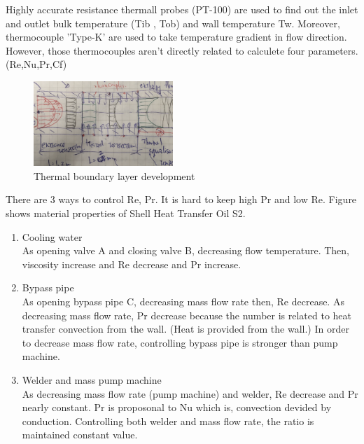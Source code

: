 \documentclass[conference]{IEEEtran}
\begin{document}
Highly accurate resistance thermall probes (PT-100) are used to find out the inlet and outlet bulk temperature (Tib , Tob) and wall temperature Tw.
Moreover, thermocouple 'Type-K' are used to take temperature gradient in flow direction.
However, those thermocouples aren't directly related to calculete four parameters.(Re,Nu,Pr,Cf)
\begin{figure}[htbp]
  \centering
\includegraphics[width=0.47\textwidth,natwidth=610,natheight=642]{fig/thermal_boundary_layer_development.png}
  \caption{Thermal boundary layer development}
  \label{thermal_boundary_layer_development}
\end{figure}

There are 3 ways to control Re, Pr.
It is hard to keep high Pr and low Re.
Figure\label{density_rho} shows material properties of Shell Heat Transfer Oil S2.

\begin{enumerate}
  \item Cooling water\\
  As opening valve A and closing valve B, decreasing flow temperature.
  Then, viscosity increase and Re decrease and Pr increase.
  \item Bypass pipe\\
  As opening bypass pipe C, decreasing mass flow rate then, Re decrease.
  As decreasing mass flow rate, Pr decrease because the number is related to heat transfer convection from the wall. (Heat is provided from the wall.)
  In order to decrease mass flow rate, controlling bypass pipe is stronger than pump machine.
  \item Welder and mass pump machine\\
  As decreasing mass flow rate (pump machine) and welder, Re decrease and Pr nearly constant.
  Pr is proposonal to Nu which is, convection devided by conduction.
  Controlling both welder and mass flow rate, the ratio is maintained constant value.
\end{enumerate}
\end{document}
